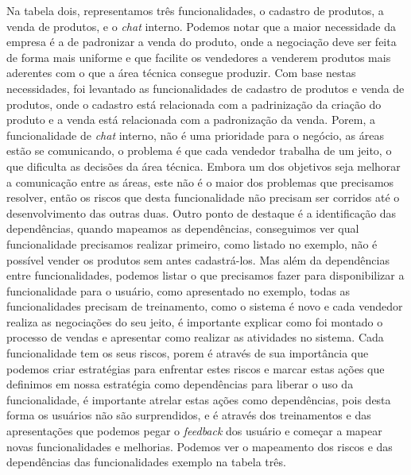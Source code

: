       Na tabela dois, representamos três funcionalidades, o cadastro de produtos,
      a venda de produtos, e o \textit{chat} interno. Podemos notar que a maior necessidade
      da empresa é a de padronizar a venda do produto, onde a negociação deve ser
      feita de forma mais uniforme e que facilite os vendedores a venderem produtos
      mais aderentes com o que a área técnica consegue produzir. Com base nestas
      necessidades, foi levantado as funcionalidades de cadastro de produtos e
      venda de produtos, onde o cadastro está relacionada com a padrinização da
      criação do produto e a venda está relacionada com a padronização da venda.
      Porem, a funcionalidade de \textit{chat} interno, não é uma prioridade para
      o negócio, as áreas estão se comunicando, o problema é que cada vendedor
      trabalha de um jeito, o que dificulta as decisões da área técnica. Embora um
      dos objetivos seja melhorar a comunicação entre as áreas, este não é o maior
      dos problemas que precisamos resolver, então os riscos que desta funcionalidade
      não precisam ser corridos até o desenvolvimento das outras duas. \newline
      Outro ponto de destaque é a identificação das dependências, quando mapeamos
      as dependências, conseguimos ver qual funcionalidade precisamos realizar
      primeiro, como listado no exemplo, não é possível vender os produtos sem antes
      cadastrá-los. Mas além da dependências entre funcionalidades, podemos listar
      o que precisamos fazer para disponibilizar a funcionalidade para o usuário,
      como apresentado no exemplo, todas as funcionalidades precisam de treinamento,
      como o sistema é novo e cada vendedor realiza as negociações do seu jeito,
      é importante explicar como foi montado o processo de vendas e apresentar
      como realizar as atividades no sistema. \newline
      Cada funcionalidade tem os seus riscos, porem é através de sua importância que
      podemos criar estratégias para enfrentar estes riscos e marcar estas ações
      que definimos em nossa estratégia como dependências para liberar o uso da
      funcionalidade, é importante atrelar estas ações como dependências, pois desta
      forma os usuários não são surprendidos, e é através dos treinamentos e das
      apresentações que podemos pegar o \textit{feedback} dos usuário e começar a
      mapear novas funcionalidades e melhorias. Podemos ver o mapeamento dos riscos
      e das dependências das funcionalidades exemplo na tabela três.\newline

